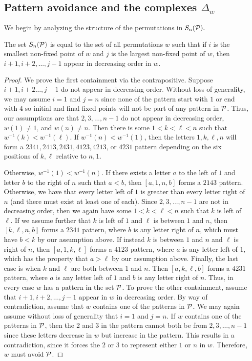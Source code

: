 \subsection{Pattern avoidance and the complexes \texorpdfstring{$\Delta_w$}{Delta w}}
We begin by analyzing the structure of the permutations in $S_n(\mathcal{P}).$
\begin{lemma}\label{lem:AvoidEquivDecrease}
    The set $S_n(\mathcal{P})$ is equal to the set of all permutations $w$ such that if $i$ is the smallest non-fixed point of $w$ and $j$ is the largest non-fixed point of $w$, then $i+1,i+2,\dots, j-1$ appear in decreasing order in $w$. 
\end{lemma}
\begin{proof}
    We prove the first containment via the contrapositive. Suppose $i+1,i+2\dots, j-1$ do not appear in decreasing order. Without loss of generality, we may assume $i=1$ and $j=n$ since none of the pattern start with $1$ or end with $4$ so initial and final fixed points will not be part of any pattern in $\mathcal{P}$. Thus, our assumptions are that $2,3,\dots, n-1$ do not appear in decreasing order, $w(1)\neq 1$, and $w(n)\neq n$. Then there is some $1<k<\ell<n$ such that $w^{-1}(k)<w^{-1}(\ell)$. If $w^{-1}(n)<w^{-1}(1)$, then the letters $1,k,\ell,n$ will form a $2341,2413,2431,4123,4213$, or $4231$ pattern depending on the six positions of $k,\ell$ relative to $n,1$. 
    
    Otherwise, $w^{-1}(1)<w^{-1}(n)$. If there exists a letter $a$ to the left of $1$ and letter $b$ to the right of $n$ such that $a<b$, then $[a,1,n,b]$ forms a $2143$ pattern. Otherwise, we have that every letter left of $1$ is greater than every letter right of $n$ (and there must exist at least one of each). Since $2,3,\dots, n-1$ are not in decreasing order, then we again have some $1<k<\ell<n$ such that $k$ is left of $\ell$. If we assume further that $k$ is left of $1$ and $\ell$ is between $1$ and $n$, then $[k,\ell,n,b]$ forms a $2341$ pattern, where $b$ is any letter right of $n$, which must have $b<k$ by our assumption above. If instead $k$ is between $1$ and $n$ and $\ell$ is right of $n$, then $[a,1,k,\ell]$ forms a $4123$ pattern, where $a$ is any letter left of $1$, which has the property that $a>\ell$ by our assumption above. Finally, the last case is when $k$ and $\ell$ are both between $1$ and $n$. Then $[a,k,\ell,b]$ forms a $4231$ pattern, where $a$ is any letter left of $1$ and $b$ is any letter right of $n$. Thus, in every case $w$ has a pattern in the set $\mathcal{P}$.
    To prove the other containment, assume that $i+1,i+2,\dots, j-1$ appear in $w$ in decreasing order. By way of contradiction, assume that $w$ contains one of the patterns in $\mathcal{P}$. We may again assume without loss of generality that $i=1$ and $j=n$. If $w$ contains one of the patterns in $\mathcal{P}$, then the $2$ and $3$ in the pattern cannot both be from $2,3,\dots, n-1$ since these letters decrease in $w$ but increase in the pattern. This results in a contradiction, since it forces the $2$ or $3$ to represent either $1$ or $n$ in $w$. Therefore, $w$ must avoid $\mathcal{P}$.
\end{proof}

